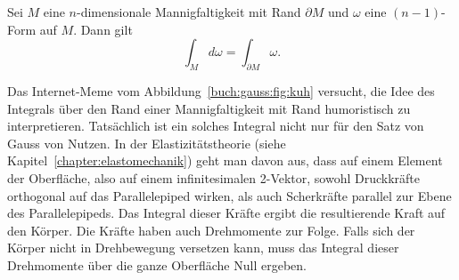 \begin{satz}[Gauss]
%
Sei $M$ eine $n$-dimensionale Mannigfaltigkeit mit Rand $\partial M$
und $\omega$ eine $(n-1)$-Form auf $M$.
Dann gilt
\[
\int_M d\omega
=
\int_{\partial M} \omega.
\]
\end{satz}

%
Das Internet-Meme vom Abbildung~\ref{buch:gauss:fig:kuh} versucht,
die Idee des Integrals über den Rand einer Mannigfaltigkeit
mit Rand humoristisch zu interpretieren.
Tatsächlich ist ein solches Integral nicht nur für den Satz von Gauss
von Nutzen.
In der Elastizitätstheorie (siehe Kapitel~\ref{chapter:elastomechanik})
geht man davon aus, dass auf einem Element
%
der Oberfläche, also auf einem infinitesimalen 2-Vektor, sowohl Druckkräfte
orthogonal auf das Parallelepiped wirken, als auch Scherkräfte parallel 
%
zur Ebene des Parallelepipeds.
Das Integral dieser Kräfte ergibt die resultierende Kraft auf den Körper.
Die Kräfte haben auch Drehmomente zur Folge.
Falls sich der Körper nicht in Drehbewegung versetzen kann, muss
das Integral dieser Drehmomente über die ganze Oberfläche
Null ergeben.

